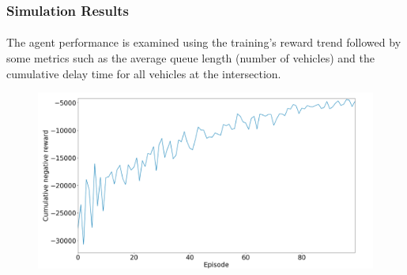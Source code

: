 \documentclass[aspectratio=169]{beamer}
\begin{document}
\begin{frame}
\frametitle{Simulation Results}
\framesubtitle{}
\vspace{1cm}
\begin{minipage}{0.4\textwidth}
The agent performance is examined using the training's reward trend followed by some metrics such as the average queue length (number of vehicles) and the cumulative delay time for all vehicles at the intersection. 

\end{minipage}%
\hfill
\begin{minipage}{0.6\textwidth}
\begin{figure}
    \centering
    \includegraphics[width=1\linewidth]{images/train_reward.png}
\end{figure}
\end{minipage}
\end{frame}
\end{document}

